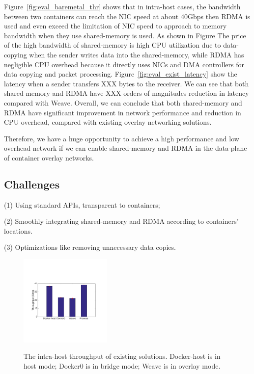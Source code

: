 Figure~\ref{fig:eval_baremetal_thr} shows that in intra-host cases, the bandwidth between two
containers can reach the NIC speed at about 40Gbps then RDMA is used and 
even exceed the limitation of NIC speed to approach to memory bandwidth when
they use shared-memory is used. As shown in Figure The price of the high bandwidth of shared-memory is high CPU utilization due to data-copying when the sender writes data into
the shared-memory, while RDMA has negligible CPU overhead because it directly uses NICs and DMA controllers for data copying and packet processing.
Figure~\ref{fig:eval_exist_latency} show the latency when a sender 
transfers XXX bytes to the receiver. We can see that both shared-memory
and RDMA have XXX orders of magnitudes reduction in latency compared with Weave.
Overall, we can conclude that both shared-memory and RDMA have 
significant improvement in network performance and reduction in CPU overhead,
compared with existing overlay networking solutions.

Therefore, we have a huge opportunity to achieve a high performance
and low overhead network if we can enable shared-memory and RDMA 
in the data-plane of container overlay networks.

\subsection{Challenges}

(1) Using standard APIs, transparent to containers;


(2) Smoothly integrating shared-memory and RDMA according to containers' locations.

(3) Optimizations like removing unnecessary data copies.

\iffalse

\begin{figure}[ht]
     \centering 
     \includegraphics[width=0.4\textwidth]{figures/motivation/eval_exist_bw.pdf} 
     \label{fig:eval_exist_bw}
     \caption{The intra-host throughput of existing solutions. Docker-host is in host mode; Docker0 is in bridge mode; Weave is in overlay mode.} 
\end{figure} 

